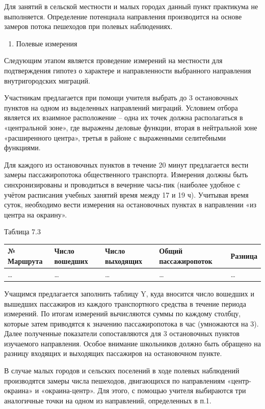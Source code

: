 \documentclass[
  11pt,
  russian,
]{book}
\providecommand{\tightlist}{%
  \setlength{\itemsep}{0pt}\setlength{\parskip}{0pt}}
\begin{document}
Для занятий в сельской местности и малых городах данный пункт практикума не выполняется. Определение потенциала
направления производится на основе замеров потока пешеходов при полевых наблюдениях.

\begin{enumerate}
\def\labelenumi{\arabic{enumi}.}
\setcounter{enumi}{1}
\tightlist
\item
  Полевые измерения
\end{enumerate}

Следующим этапом является проведение измерений на местности для подтверждения гипотез о характере и направленности
выбранного направления внутригородских миграций.

Участникам предлагается при помощи учителя выбрать до 3 остановочных пунктов на одном из выделенных направлений миграций. Условием отбора является их взаимное расположение -- одна их точек должна располагаться в «центральной зоне», где выражены деловые функции, вторая в нейтральной зоне «расширенного центра», третья в районе с выраженными селитебными функциями.

Для каждого из остановочных пунктов в течение 20 минут предлагается вести замеры пассажиропотока общественного
транспорта. Измерения должны быть синхронизированы и проводиться в вечерние часы-пик (наиболее удобное с учётом расписания учебных занятий время между 17 и 19 ч). Учитывая время суток, необходимо вести измерения на остановочных пунктах в направлении «из центра на окраину».

Таблица 7.3

\begin{longtable}[]{@{}lllll@{}}
\toprule
№ Маршрута & Число вошедших & Число выходящих & Общий пассажиропоток & Разница \\
\midrule
\endhead
\ldots{} & \ldots{} & \ldots{} & \ldots{} & \ldots{} \\
\bottomrule
\end{longtable}

Учащимся предлагается заполнить таблицу Y, куда вносится число вошедших и
вышедших пассажиров из каждого транспортного средства в течение периода
измерений. По итогам измерений вычисляются суммы по каждому столбцу, которые
затем приводятся к значению пассажиропотока в час (умножаются на 3). Далее
полученные показатели сопоставляются для 3 остановочных пунктов изучаемого
направления. Особое внимание школьников должно быть обращено на разницу
входящих и выходящих пассажиров на остановочном пункте.

В случае малых городов и сельских
поселений в ходе полевых наблюдений производятся замеры числа пешеходов,
двигающихся по направлениям «центр-окраина» и «окраина-центр». Для этого, с
помощью учителя выбираются три аналогичные точки на одном из направлений,
определенных в п.1.
\end{document}
